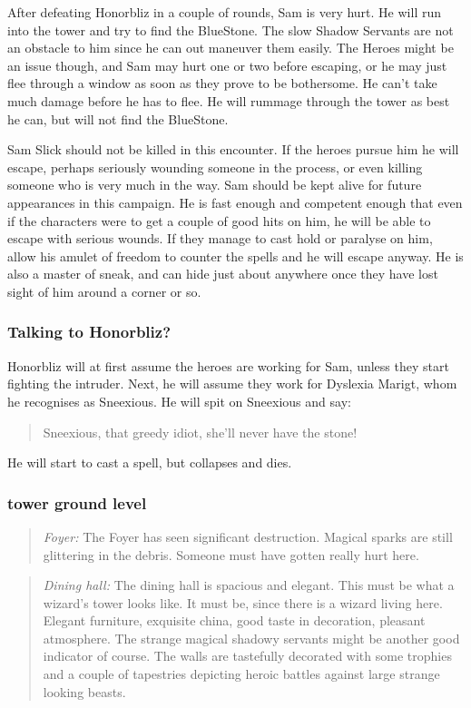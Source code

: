\documentclass[11pt, twoside, titlepage, a4paper]{report}
\newenvironment{readoutloud}%
{\begin{quote}\begin{itshape}}%
{\end{itshape}\end{quote}}%
\begin{document}
After defeating Honorbliz in a couple of rounds, Sam is very hurt. He will run into the tower and try to find the BlueStone. The slow Shadow Servants are not an obstacle to him since he can out maneuver them easily. The Heroes might be an issue though, and Sam may hurt one or two before escaping, or he may just flee through a window as soon as they prove to be bothersome. He can't take much damage before he has to flee. He will rummage through the tower as best he can, but will not find the BlueStone.

Sam Slick should not be killed in this encounter. If the heroes pursue him he will escape, perhaps seriously wounding someone in the process, or even killing someone who is very much in the way. Sam should be kept alive for future appearances in this campaign. He is fast enough and competent enough that even if the characters were to get a couple of good hits on him, he will be able to escape with serious wounds. If they manage to cast hold or paralyse on him, allow his amulet of freedom to counter the spells and he will escape anyway. He is also a master of sneak, and can hide just about anywhere once they have lost sight of him around a corner or so.


\subsubsection*{Talking to Honorbliz?}
Honorbliz will at first assume the heroes are working for Sam, unless they start fighting the intruder. Next, he will assume they work for Dyslexia Marigt, whom he recognises as Sneexious. He will spit on Sneexious and say:
\begin{readoutloud}
Sneexious, that greedy idiot, she'll never have the stone!
\end{readoutloud}
He will start to cast a spell, but collapses and dies.


\subsubsection*{tower ground level}
\begin{readoutloud}
\emph{Foyer:}
The Foyer has seen significant destruction. Magical sparks are still glittering in the debris. Someone must have gotten really hurt here.
\end{readoutloud}

\begin{readoutloud}
\emph{Dining hall:}
The dining hall is spacious and elegant. This must be what a wizard's tower looks like. It must be, since there is a wizard living here. Elegant furniture, exquisite china, good taste in decoration, pleasant atmosphere. The strange magical shadowy servants might be another good indicator of course.
The walls are tastefully decorated with some trophies and a couple of tapestries depicting heroic battles against large strange looking beasts.
\end{readoutloud}
\end{document}
